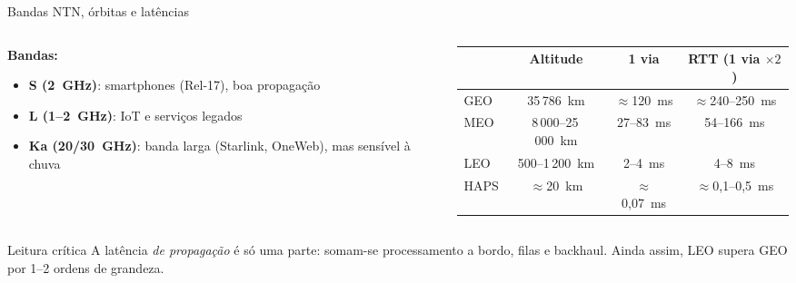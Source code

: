 \documentclass[aspectratio=169,11pt]{beamer}
\begin{document}
\begin{frame}{Bandas NTN, órbitas e latências}
  \begin{columns}
    \begin{column}{0.5\textwidth}
      \textbf{Bandas:}
      \begin{itemize}
        \item \textbf{S (2~GHz)}: smartphones (Rel-17), boa propagação
        \item \textbf{L (1--2~GHz)}: IoT e serviços legados
        \item \textbf{Ka (20/30~GHz)}: banda larga (Starlink, OneWeb), mas sensível à chuva
      \end{itemize}
    \end{column}
    \begin{column}{0.5\textwidth}
      \begin{center}
        \begin{tabular}{@{}lccc@{}}
          \toprule
          & Altitude & 1 via & RTT (1 via $\times 2$)\\
          \midrule
          GEO & 35\,786~km & $\approx$120~ms & $\approx$240--250~ms \\
          MEO & 8\,000--25\,000~km & 27--83~ms & 54--166~ms \\
          LEO & 500--1\,200~km & 2--4~ms & 4--8~ms \\
          HAPS & $\approx$20~km & $\approx$0,07~ms & $\approx$0,1--0,5~ms \\
          \bottomrule
        \end{tabular}
      \end{center}
    \end{column}
  \end{columns}
  \pause
  \begin{alertblock}{Leitura crítica}
    A latência \emph{de propagação} é só uma parte: somam-se processamento a bordo, filas e backhaul. Ainda assim, LEO supera GEO por 1--2 ordens de grandeza.
  \end{alertblock}
\end{frame}
\end{document}

